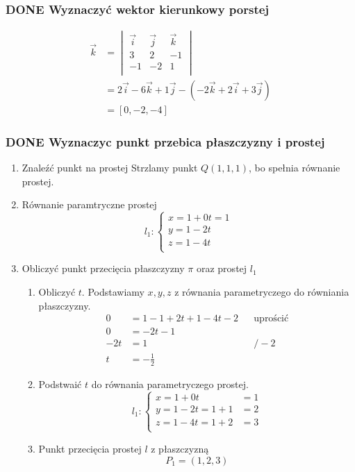 \documentclass[11pt]{article}
\begin{document}
\subsubsection{{\bfseries\sffamily DONE} Wyznaczyć wektor kierunkowy porstej}
\label{sec:orgf9479a8}
\begin{align*}
  \vec k &= \begin{vmatrix}
              \vec i & \vec j & \vec k\\
              3 & 2 & -1 \\
              -1 & -2 & 1\\
            \end{vmatrix}
  \\
         &= 2 \vec i - 6 \vec k + 1 \vec j - (-2 \vec k + 2 \vec i + 3 \vec j)
  \\
         &= [0, -2, -4]
\end{align*}
\subsubsection{{\bfseries\sffamily DONE} Wyznaczyc punkt przebica płaszczyzny i prostej}
\label{sec:orga1b5a2d}
\begin{enumerate}
\item Znaleźć punkt na prostej
\label{sec:org5b89949}
Strzlamy punkt \(Q(1,1,1)\), bo spełnia równanie prostej.
\item Równanie paramtryczne prostej
\label{sec:org366729c}
\[l_1 : \begin{cases}
        x = 1 + 0t = 1\\
        y = 1 - 2t \\
        z = 1 - 4t\\
\end{cases}\]
\item Obliczyć punkt przecięcia płaszczyzny \(\pi\) oraz prostej \(l_1\)
\label{sec:orgfd47559}
\begin{enumerate}
\item Obliczyć \(t\).
\label{sec:org0596648}
Podstawiamy \(x, y, z\) z równania parametryczego do równiania płaszczyzny.
\begin{align*}
  0 &= 1 - 1 + 2t + 1 - 4t -2 && \text{uprościć}
  \\
  0 &= -2t -1
  \\
  -2t &= 1 && / -2
  \\
  t &= - \frac{1}{2}
\end{align*}
\item Podstwaić \(t\) do równania parametryczego prostej.
\label{sec:orgc68c363}
\[l_1 : \begin{cases}
        x = 1 + 0t &= 1\\
        y = 1 - 2t = 1 + 1 &= 2 \\
        z = 1 - 4t = 1 + 2 &= 3\\
\end{cases}\]
\item Punkt przecięcia prostej \(l\) z płaszczyzną
\label{sec:org0284829}
\[P_1 = (1, 2, 3)\]
\end{enumerate}
\end{enumerate}
\end{document}
